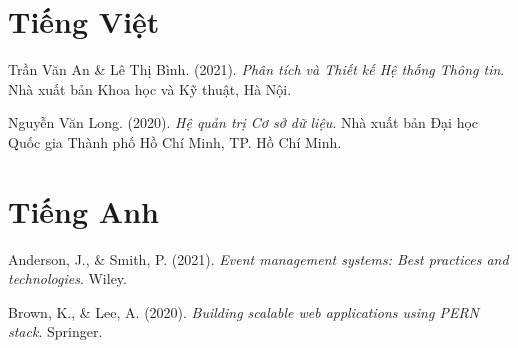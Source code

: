 
\section*{Tiếng Việt}

\begin{enumerate}[label={[\arabic*]}]
    \item Trần Văn An \& Lê Thị Bình. (2021). \textit{Phân tích và Thiết kế Hệ thống Thông tin}. Nhà xuất bản Khoa học và Kỹ thuật, Hà Nội.
    \item Nguyễn Văn Long. (2020). \textit{Hệ quản trị Cơ sở dữ liệu}. Nhà xuất bản Đại học Quốc gia Thành phố Hồ Chí Minh, TP. Hồ Chí Minh.
\end{enumerate}

\section*{Tiếng Anh}

\begin{enumerate}[label={[\arabic*]}]
    \item Anderson, J., \& Smith, P. (2021). \textit{Event management systems: Best practices and technologies}. Wiley.
    \item Brown, K., \& Lee, A. (2020). \textit{Building scalable web applications using PERN stack}. Springer.
\end{enumerate}
